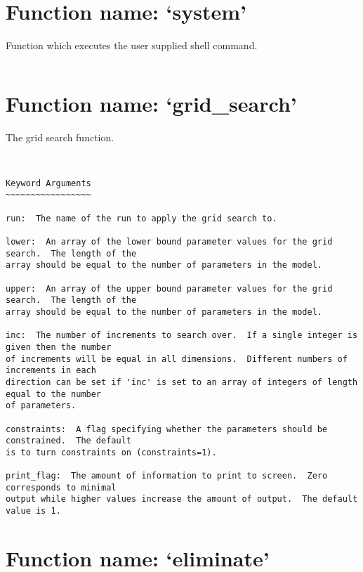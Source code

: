 \normalsize
\section{Function name: `system'}

Function which executes the user supplied shell command.
\scriptsize
\begin{verbatim}

\end{verbatim}

\normalsize
\section{Function name: `grid\_search'}

The grid search function.
\scriptsize
\begin{verbatim}


Keyword Arguments
~~~~~~~~~~~~~~~~~

run:  The name of the run to apply the grid search to.

lower:  An array of the lower bound parameter values for the grid search.  The length of the
array should be equal to the number of parameters in the model.

upper:  An array of the upper bound parameter values for the grid search.  The length of the
array should be equal to the number of parameters in the model.

inc:  The number of increments to search over.  If a single integer is given then the number
of increments will be equal in all dimensions.  Different numbers of increments in each
direction can be set if 'inc' is set to an array of integers of length equal to the number
of parameters.

constraints:  A flag specifying whether the parameters should be constrained.  The default
is to turn constraints on (constraints=1).

print_flag:  The amount of information to print to screen.  Zero corresponds to minimal
output while higher values increase the amount of output.  The default value is 1.

\end{verbatim}

\normalsize
\section{Function name: `eliminate'}

